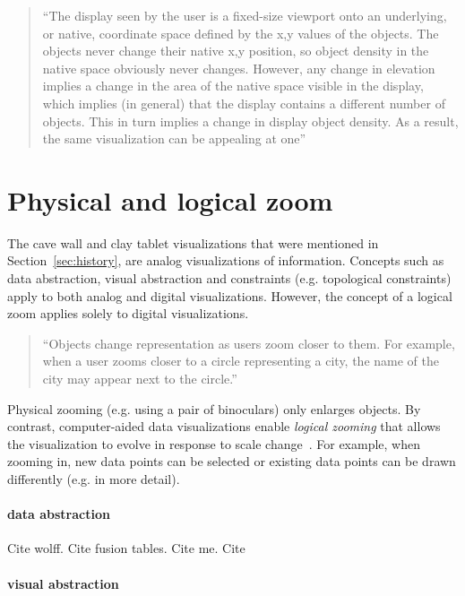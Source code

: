 \documentclass[11pt, oneside]{report}   	%
\begin{document}
\begin{quote}
``The display seen by the user is a fixed-size viewport onto an underlying, or native, coordinate space defined by the x,y values of the objects. The objects never change their native x,y position, so object density in the native space obviously never changes. However, any change in elevation implies a change in the area of the native space visible in the display, which implies (in general) that the display contains a different number of objects. This in turn implies a change in display object density. As a result, the same visualization can be appealing at one''
\end{quote}

\section{Physical and logical zoom}

The cave wall and clay tablet visualizations that were mentioned in Section~\ref{sec:history}, are analog visualizations of information. Concepts such as data abstraction, visual abstraction and constraints (e.g. topological constraints) apply to both analog and digital visualizations. However, the concept of a logical zoom applies solely to digital visualizations. 




\begin{quote}
``Objects change representation as users zoom closer to them. For example, when a user zooms closer to a circle representing a city, the name of the city may appear next to the circle.''
\end{quote}

Physical zooming (e.g. using a pair of binoculars) only enlarges objects. By contrast, computer-aided data visualizations enable \emph{logical zooming} that allows the visualization to evolve in response to scale change~\cite{van1990reactive}. For example, when zooming in, new data points can be selected or existing data points can be drawn differently (e.g. in more detail).

\paragraph{data abstraction}

Cite wolff. Cite fusion tables. Cite me. Cite 

\paragraph{visual abstraction}
\end{document}
